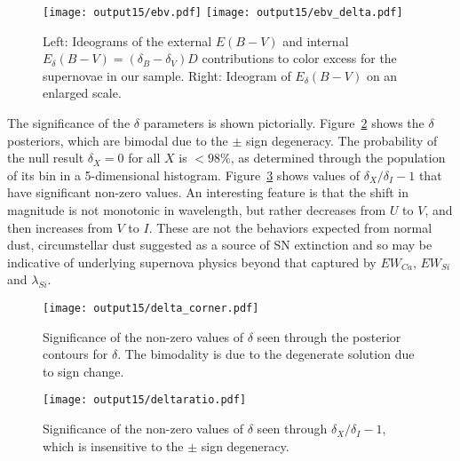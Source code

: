 \documentclass{aastex61}   	%
\begin{document}
\begin{figure}[htbp] %
   \centering
   \texttt{[image: output15/ebv.pdf]}
   \texttt{[image: output15/ebv\_delta.pdf]}
      \caption{Left: Ideograms of the external $E(B-V)$ and
   internal $E_\delta(B-V) = (\delta_B-\delta_V)D$  contributions to color excess  for the supernovae in our sample.
   Right: Ideogram of $E_\delta(B-V)$ on an enlarged scale.
   \label{ebv:fig}}
\end{figure}
The significance of the $\delta$ parameters is shown pictorially.
Figure~\ref{deltacorner:fig} shows the $\delta$ posteriors, which are bimodal due to the $\pm$ sign degeneracy.  The probability
of the null result $\delta_X=0$ for all $X$ is $<98\%$, as determined through
the population of its bin in a 5-dimensional histogram.
Figure~\ref{deltaratio:fig} shows  values of $\delta_X/\delta_I-1$ that  have significant non-zero values.   An interesting feature
is that the shift in magnitude is not monotonic in wavelength, but rather decreases from $U$ to $V$, and then increases from $V$
to $I$.
These are not the behaviors expected from normal dust,
circumstellar dust suggested as a source of SN extinction \citep{2005ApJ...635L..33W,2008ApJ...686L.103G,
2015ApJ...807L..26G} and so may be indicative of underlying supernova physics beyond that captured by $EW_{Ca}$, $EW_{Si}$ and
$\lambda_{Si}$.

\begin{figure}[htbp] %
   \centering
   \texttt{[image: output15/delta\_corner.pdf]}
   \caption{Significance of the non-zero values of $\delta$ seen through the posterior contours for $\delta$.  The bimodality is due to the degenerate solution due to sign change.
   \label{deltacorner:fig}}
\end{figure}


\begin{figure}[htbp] %
   \centering
      \texttt{[image: output15/deltaratio.pdf]}
   \caption{Significance of the non-zero values of $\delta$ seen through $\delta_X/\delta_I-1$, which is insensitive to the $\pm$ sign degeneracy.
   \label{deltaratio:fig}}
\end{figure}
\end{document}
